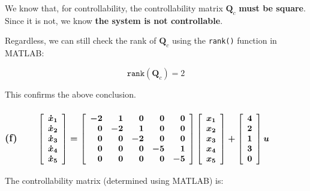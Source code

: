 \documentclass[12pt, letterpaper]{../assignment}
\begin{document}
\begin{answer}
We know that, for controllability,
the controllability matrix $\textbf{Q}_c$ \textbf{must be square}.
Since it is not, we know \textbf{the system is not controllable}.
\end{answer}

Regardless, we can still check the rank of $\textbf{Q}_c$ using the \texttt{rank()} function in MATLAB:

$$ \texttt{rank}(\textbf{Q}_c ) = 2 $$

This confirms the above conclusion.

\subsubsection*{(f) \ \ \ $\boldmath{
\left[\begin{array}{c} \dot{x}_1\\\dot{x}_2\\\dot{x}_3\\\dot{x}_4\\\dot{x}_5 \end{array}\right]
= \left[\begin{array}{rrrrr}
            -2 & 1 & 0 & 0 & 0\\
             0 & -2  & 1 & 0 & 0\\
             0 & 0  & -2 & 0 & 0\\
             0 & 0  & 0 & -5 & 1\\
             0 & 0 & 0 & 0 & -5
        \end{array}\right]
\left[\begin{array}{c} x_1\\x_2\\x_3\\x_4\\x_5  \end{array}\right]
+ \left[\begin{array}{r} 4  \\ 2 \\ 1 \\ 3 \\ 0 \end{array}\right] u}$}


The controllability matrix (determined using MATLAB) is:
\end{document}

